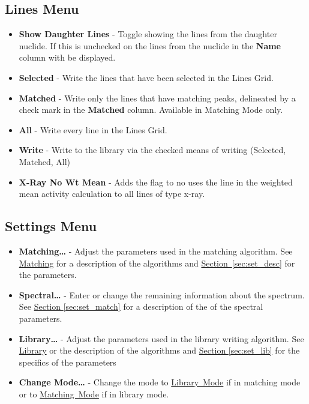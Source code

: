 \documentclass[12pt,report,justified]{SANDreport}
\begin{document}
\subsection{Lines Menu}\label{sec:line_menu}
\begin{itemize}
    \item \textbf{Show Daughter Lines} - Toggle showing the lines from the daughter nuclide. If this is unchecked
        on the lines from the nuclide in the \textbf{Name} column with be displayed.
    \item \textbf{Selected} - Write the lines that have been selected in the Lines Grid.
    \item \textbf{Matched} - Write only the lines that have matching peaks, delineated by a check mark in the
        \textbf{Matched} column. Available in Matching Mode only.
    \item \textbf{All} - Write every line in the Lines Grid.
    \item \textbf{Write} - Write to the library via the checked means of writing (Selected, Matched, All)
    \item \textbf{X-Ray No Wt Mean} - Adds the flag to no uses the line in the weighted mean activity calculation
        to all lines of type x-ray.
\end{itemize}

\subsection{Settings Menu}\label{sec:set_menu}
\begin{itemize}
    \item \textbf{Matching\ldots} - Adjust the parameters used in the matching algorithm. See
        \hyperref[sec:match]{Matching} for a description of the algorithms and
        \hyperref[sec:set_desc]{Section~\ref{sec:set_desc}} for the parameters.
    \item \textbf{Spectral\ldots} - Enter or change the remaining information about the spectrum. See
        \hyperref[sec:set_match]{Section \ref{sec:set_match}} for a description of the of the
        spectral parameters.
    \item \textbf{Library\ldots} - Adjust the parameters used in the library writing algorithm. See
        \hyperref[sec:library]{Library} or the description of the algorithms and
        \hyperref[sec:set_lib]{Section \ref{sec:set_lib}} for the specifics of the parameters
    \item \textbf{Change Mode\ldots} - Change the mode to \hyperref[sec:lib_mode]{Library~Mode} if in matching mode
        or to \hyperref[sec:match_mode]{Matching~Mode} if in library mode.
\end{itemize}
\end{document}

